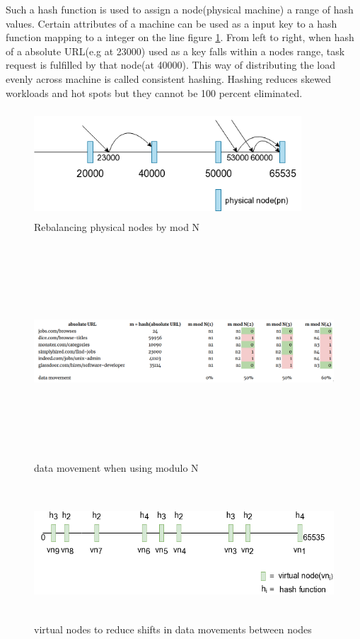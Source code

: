 \pagebreak

\noindent
Such a hash function is used to assign a node(physical machine) a range of hash values. Certain attributes of a machine can be used as a input key to a hash function mapping to a integer on the line figure \ref{fig:modnsplit}. From left to right, when hash of a absolute URL(e.g at 23000) used as a key falls within a nodes range, task request is fulfilled by that node(at 40000). This way of distributing the load evenly across
machine is called consistent hashing\cite{consisthash}. Hashing reduces skewed workloads and hot spots
but they cannot be 100 percent eliminated.

\begin{figure}[h!]
  \centering
  \includegraphics[width=10cm,height=4cm,keepaspectratio]{../media/crawler/modnsplit.png}
  \caption{Rebalancing physical nodes by mod N}
  \label{fig:modnsplit}
\end{figure}

\begin{figure}[h!]
  \centering
  \includegraphics[width=16cm,height=8cm,keepaspectratio]{../media/crawler/modn_info.png}
  \caption{data movement when using modulo N}
  \label{fig:movemodn}
\end{figure}

\begin{figure}[h!]
  \centering
  \includegraphics[width=12cm,height=5cm,keepaspectratio]{../media/crawler/vnodesplit1.png}
  \caption{virtual nodes to reduce shifts in data movements between nodes}
  \label{fig:vnodesplit1}
\end{figure}

